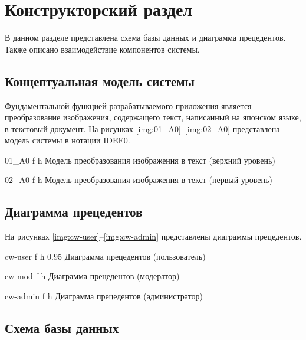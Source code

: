 \chapter{Конструкторский раздел}

В данном разделе представлена схема базы данных и диаграмма прецедентов. Также описано взаимодействие компонентов системы.

\section{Концептуальная модель системы}

Фундаментальной функцией разрабатываемого приложения является преобразование изображения, содержащего текст, написанный на японском языке, в текстовый документ. На рисунках \ref{img:01_A0}--\ref{img:02_A0} представлена модель системы в нотации IDEF0.

    {01_A0}
    {f}
    {h}
    {\linewidth}
    {Модель преобразования изображения в текст (верхний уровень)}

\clearpage

    {02_A0}
    {f}
    {h}
    {\linewidth}
    {Модель преобразования изображения в текст (первый уровень)}

\section{Диаграмма прецедентов}

На рисунках \ref{img:cw-user}--\ref{img:cw-admin} представлены диаграммы прецедентов.

    {cw-user}
    {f}
    {h}
    {0.95\linewidth}
    {Диаграмма прецедентов (пользователь)}

    {cw-mod}
    {f}
    {h}
    {\linewidth}
    {Диаграмма прецедентов (модератор)}

    {cw-admin}
    {f}
    {h}
    {\linewidth}
    {Диаграмма прецедентов (администратор)}

\clearpage

\section{Схема базы данных}

